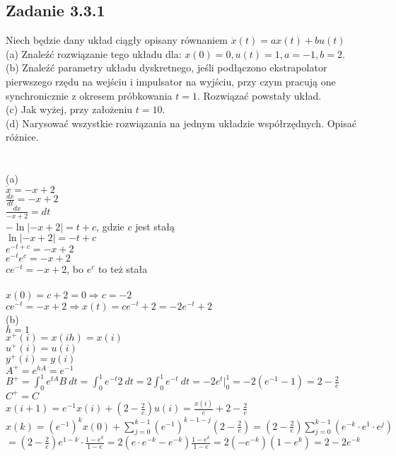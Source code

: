 \pagebreak
\subsection*{Zadanie 3.3.1} {\color{darkgray}
	Niech będzie dany układ ciągły opisany równaniem $\dot{x}(t)=ax(t)+bu(t)$\\
	(a) Znaleźć rozwiązanie tego układu dla: $x(0)=0, u(t)=1, a=-1, b=2$.\\
	(b) Znaleźć parametry układu dyskretnego, jeśli podłączono ekstrapolator pierwszego rzędu na wejściu
	i impulsator na wyjściu, przy czym pracują one synchronicznie z okresem próbkowania $t = 1$. 
	Rozwiązać powstały układ.\\
	(c) Jak wyżej, przy założeniu $t = 10$.\\
	(d) Narysować wszystkie rozwiązania na jednym układzie współrzędnych. Opisać różnice.\\
}\lineh
\\\\
(a)\\
$\dot{x}=-x+2$\\
$\frac{dx}{dt}=-x+2$\\
$\frac{dx}{-x+2}=dt$\\
$-\ln |-x+2|=t+c$, gdzie $c$ jest stałą \\
$\ln |-x+2|=-t+c$\\
$e^{-t+c}=-x+2$\\
$e^{-t}e^c=-x+2$\\
$ce^{-t}=-x+2$, bo $e^c$ to też stała\\
\\
$x(0)=c+2=0 \Rightarrow c=-2$\\
$ce^{-t}=-x+2 \Rightarrow \boxed{x(t)=ce^{-t}+2=-2e^{-t}+2}$\\


\noindent
(b)\\
$h=1$\\
$x^+(i)=x(ih)=x(i)$\\
$u^+(i)=u(i)$\\
$y^+(i)=y(i)$\\
$A^+=e^{hA}=e^{-1}$\\
$B^+=\int_0^1e^{tA}B\ dt =\int_0^1e^{-t}2\ dt=2\int_0^1e^{-t}\ dt = -2e^t|^1_0=-2(e^{-1}-1)=2-\frac{2}{e}$\\
$C^+=C$\\
$x(i+1)=e^{-1}x(i)+(2-\frac{2}{e})u(i)=\frac{x(i)}{e}+2-\frac{2}{e}$\\
$x(k)=(e^{-1})^kx(0)+\sum_{j=0}^{k-1}(e^{-1})^{k-1-j}(2-\frac{2}{e})=(2-\frac{2}{e})\sum_{j=0}^{k-1}(e^{-k}\cdot e^1\cdot e^j)$\\
$=(2-\frac{2}{e})e^{1-k}\cdot\frac{1-e^k}{1-e}=2(e\cdot e^{-k} -e^{-k})\frac{1-e^k}{1-e}=2(-e^{-k})(1-e^k)=2-2e^{-k}$\\

